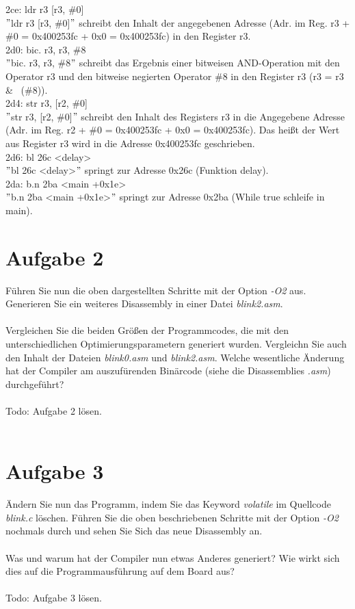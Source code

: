 2ce: ldr r3 [r3, \#0]\\
$"$ldr r3 [r3, \#0]$"$ schreibt den Inhalt der angegebenen Adresse (Adr. im Reg. r3 + \#0 = 0x400253fc + 0x0 = 0x400253fc) in den Register r3.\\
2d0: bic. r3, r3, \#8\\
$"$bic. r3, r3, \#8$"$ schreibt das Ergebnis einer bitweisen AND-Operation mit den Operator r3 und den bitweise negierten Operator \#8 in den Register r3 (r3 = r3 \& ~(\#8)).\\
2d4: str r3, [r2, \#0]\\
$"$str r3, [r2, \#0]$"$ schreibt den Inhalt des Registers r3 in die Angegebene Adresse (Adr. im Reg. r2 + \#0 = 0x400253fc + 0x0 = 0x400253fc). Das hei\ss{}t der Wert aus Register r3 wird in die Adresse 0x400253fc geschrieben.\\
2d6: bl 26c <delay>\\
$"$bl 26c <delay>$"$ springt zur Adresse 0x26c (Funktion delay).\\
2da: b.n 2ba <main +0x1e>\\
$"$b.n 2ba <main +0x1e>$"$ springt zur Adresse 0x2ba (While true schleife in main).\\
\newpage
\section{Aufgabe 2}
Führen Sie nun die oben dargestellten Schritte mit der Option \textit{-O2} aus. Generieren Sie ein weiteres Disassembly in einer Datei \textit{blink2.asm}.\\ \\
Vergleichen Sie die beiden Grö\ss{}en der Programmcodes, die mit den unterschiedlichen Optimierungsparametern generiert wurden. Vergleichn Sie auch den Inhalt der Dateien \textit{blink0.asm} und \textit{blink2.asm}. Welche wesentliche Änderung hat der Compiler am auszufürenden Binärcode (siehe die Disassemblies \textit{.asm}) durchgeführt?\\ \\
Todo: Aufgabe 2 lösen.\\ \\
\section{Aufgabe 3}
Ändern Sie nun das Programm, indem Sie das Keyword \textit{volatile} im Quellcode \textit{blink.c} löschen. Führen Sie die oben beschriebenen Schritte mit der Option \textit{-O2} nochmals durch und sehen Sie Sich das neue Disassembly an.\\ \\
Was und warum hat der Compiler nun etwas Anderes generiert? Wie wirkt sich dies auf die Programmausführung auf dem Board aus?\\ \\
Todo: Aufgabe 3 lösen.\\
